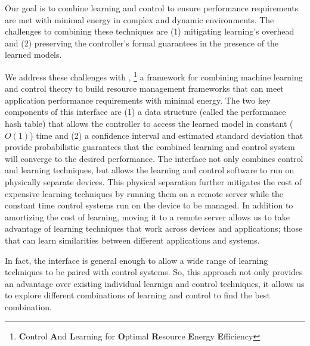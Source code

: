Our goal is to combine learning and control to ensure performance
requirements are met with minimal energy in complex and dynamic
environments.  The challenges to combining these techniques are (1)
mitigating learning's overhead and (2) preserving the controller's
formal guarantees in the presence of the learned models.

We address these challenges with \SYSTEM{}, \footnote{\textbf{C}ontrol
  \textbf{A}nd \textbf{L}earning for \textbf{O}ptimal
  \textbf{R}esource \textbf{E}nergy \textbf{E}fficiency} a framework
for combining machine learning and control theory to build resource
management frameworks that can meet application performance
requirements with minimal energy.  The two key components of this
interface are (1) a data structure (called the performance hash table)
that allows the controller to access the learned model in constant
($O(1)$) time and (2) a confidence interval and estimated standard
deviation that provide probabilistic guarantees that the combined
learning and control system will converge to the desired performance.
The \SYSTEM{} interface not only combines control and learning
techniques, but allows the learning and control software to run on
physically separate devices.  This physical separation further
mitigates the cost of expensive learning techniques by running them on
a remote server while the constant time control systems run on the
device to be managed.  In addition to amortizing the cost of learning,
moving it to a remote server allows us to take advantage of learning
techniques that work across devices and applications; \ie{} those that
can learn similarities between different applications and systems.

In fact, the \SYSTEM{} interface is general enough to allow a wide
range of learning techniques to be paired with control systems.  So,
this approach not only provides an advantage over existing individual
learnign and control techniques, it allows us to explore different
combinations of learning and control to find the best combination.

